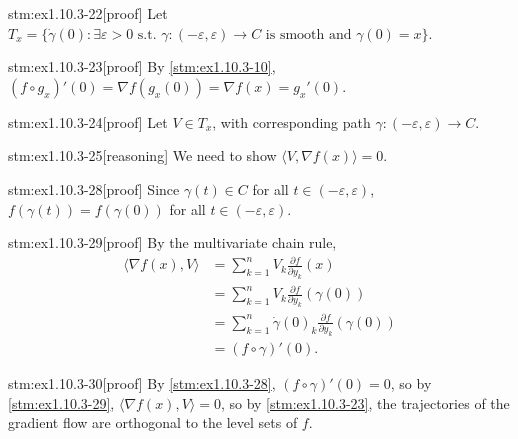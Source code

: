 \begin{stm}{stm:ex1.10.3-22}[proof]
Let $T_x = \{ \dot{\gamma}(0) : \exists \varepsilon > 0 \text{ s.t. } \gamma : (-\varepsilon, \varepsilon) \to C \text{ is smooth and } \gamma(0) = x \}$.
\end{stm}

\begin{stm}{stm:ex1.10.3-23}[proof]
By \ref{stm:ex1.10.3-10}, $(f \circ g_x)'(0) = \nabla f(g_x(0)) = \nabla f(x) = g_x'(0)$.
\end{stm}

\begin{stm}{stm:ex1.10.3-24}[proof]
Let $V \in T_x$, with corresponding path $\gamma : (-\varepsilon, \varepsilon) \to C$.
\end{stm}

\begin{stm}{stm:ex1.10.3-25}[reasoning]
We need to show $\langle V, \nabla f(x) \rangle = 0$.
\end{stm}

\begin{stm}{stm:ex1.10.3-28}[proof]
Since $\gamma(t) \in C$ for all $t \in (-\varepsilon, \varepsilon)$, $f(\gamma(t)) = f(\gamma(0))$ for all $t \in (-\varepsilon, \varepsilon)$. 
\end{stm}

\begin{stm}{stm:ex1.10.3-29}[proof]
By the multivariate chain rule,
\begin{align*}
\langle \nabla f(x), V \rangle 
&= \sum_{k=1}^n V_k \frac{\partial f}{\partial y_k}(x) \\
&= \sum_{k=1}^n V_k \frac{\partial f}{\partial y_k}(\gamma(0)) \\
&= \sum_{k=1}^n \dot{\gamma}(0)_k \frac{\partial f}{\partial y_k}(\gamma(0)) \\
&= (f \circ \gamma)'(0).
\end{align*}
\end{stm}

\begin{stm}{stm:ex1.10.3-30}[proof]
By \ref{stm:ex1.10.3-28}, $(f \circ \gamma)'(0) = 0$, so by \ref{stm:ex1.10.3-29}, $\langle \nabla f(x), V \rangle = 0$, so by \ref{stm:ex1.10.3-23}, the trajectories of the gradient flow are orthogonal to the level sets of $f$.
\end{stm}